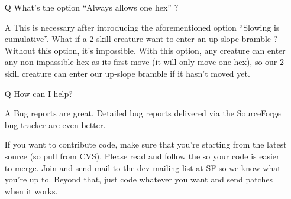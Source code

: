 \documentclass{article}
\begin{document}
\begin{itemize}
\item[Q] What's the option ``Always allows one hex'' ?

\item[A] This is necessary after introducing the aforementioned option
``Slowing is cumulative''. What if a 2-skill creature want to enter an
up-slope bramble ? Without this option, it's impossible. With this option,
any creature can enter any non-impassible hex as its first move (it will only
move one hex), so our 2-skill creature can enter our up-slope bramble
if it hasn't moved yet.

\item[Q] How can I help?

\item[A] Bug reports are great. Detailed bug reports delivered via the 
 SourceForge bug tracker are even better. 
 
 If you want to contribute code, make sure that you're starting 
 from the latest source (so pull from CVS). Please read and follow
 the 
 so your code is easier to merge. Join and send mail to the dev mailing
 list at SF so we know what you're up to. Beyond that, just code whatever
 you want and send patches when it works.

\end{itemize}
\end{document}
